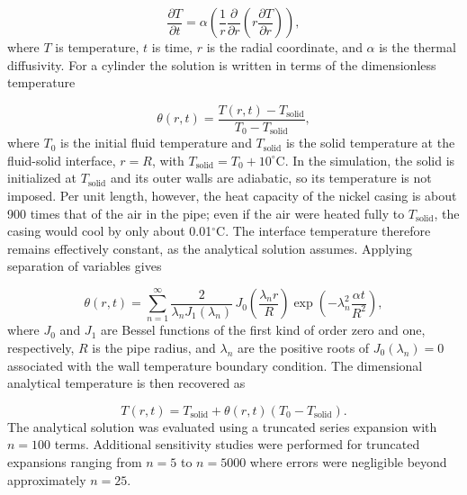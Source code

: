 \begin{equation}
    \frac{\partial T}{\partial t}=\alpha\left(\frac{1}{r}\frac{\partial}{\partial r}\left(r\frac{\partial T}{\partial r}\right)\right),
\label{eq:transient_diffusion}
\end{equation}
where $T$ is temperature, $t$ is time, $r$ is the radial coordinate, and $\alpha$ is the thermal diffusivity. For a cylinder the solution is written in terms of the dimensionless temperature

\begin{equation}
    \theta(r,t)=\frac{T(r,t)-T_{\text{solid}}}{T_0-T_{\text{solid}}},
\label{eq:theta_definition}
\end{equation}
where $T_0$ is the initial fluid temperature and $T_{\text{solid}}$ is the solid temperature at the fluid-solid interface, $r = R$, with $T_{\text{solid}} = T_0 + 10^{\circ}$C. In the simulation, the solid is initialized at $T_{\text{solid}}$ and its outer walls are adiabatic, so its temperature is not imposed. Per unit length, however, the heat capacity of the nickel casing is about 900 times that of the air in the pipe; even if the air were heated fully to $T_{\text{solid}}$, the casing would cool by only about 0.01$^{\circ}$C. The interface temperature therefore remains effectively constant, as the analytical solution assumes. Applying separation of variables gives

\begin{equation}
    \theta(r,t)=\sum_{n=1}^{\infty}\frac{2}{\lambda_n J_1(\lambda_n)}\,J_0\!\left(\frac{\lambda_n r}{R}\right)\exp\left(-\lambda_n^2 \frac{\alpha t}{R^2}\right),
\label{eq:bessel_theta_solution}
\end{equation}
where $J_0$ and $J_1$ are Bessel functions of the first kind of order zero and one, respectively, $R$ is the pipe radius, and $\lambda_n$ are the positive roots of $J_0(\lambda_n)=0$ associated with the wall temperature boundary condition. The dimensional analytical temperature is then recovered as

\begin{equation}
    T(r,t)=T_{\text{solid}}+\theta(r,t)\left(T_0 - T_{\text{solid}}\right).
\label{eq:dimensional_temperature}
\end{equation}
The analytical solution was evaluated using a truncated series expansion with $n=100$ terms. Additional sensitivity studies were performed for truncated expansions ranging from $n=5$ to $n=5000$ where errors were negligible beyond approximately $n=25$. 

